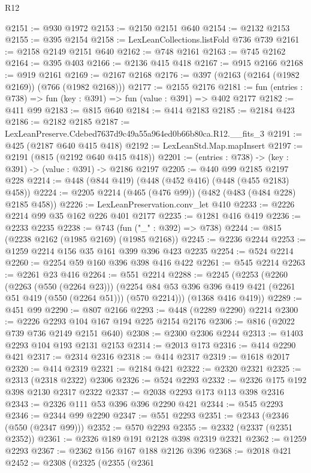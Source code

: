 \begin{lexlean}{R12}
\begin{coremodule}
@2151 := @930 @1972
@2153 := @2150 @2151 @640
@2154 := @2132 @2153
@2155 := @395 @2154
@2158 := LexLeanCollections.listFold @736 @739
@2161 := @2158 @2149 @2151 @640
@2162 := @748 @2161
@2163 := @745 @2162
@2164 := @395 @403
@2166 := @2136 @415 @418
@2167 := @915 @2166
@2168 := @919 @2161
@2169 := @2167 @2168
@2176 := @397 (@2163 (@2164 (@1982 @2169)) (@766 (@1982 @2168)))
@2177 := @2155 @2176
@2181 := fun (entries : @738) => fun (key : @391) => fun (value : @391) => @402 @2177
@2182 := @411 @99
@2183 := @815 @640
@2184 := @414 @2183
@2185 := @2184 @423
@2186 := @2182 @2185
@2187 := LexLeanPreserve.Cdebed7637d9c49a55a964ed0b66b80ca.R12.__fits_3
@2191 := @425 (@2187 @640 @415 @418)
@2192 := LexLeanStd.Map.mapInsert
@2197 := @2191 (@815 (@2192 @640 @415 @418))
@2201 := (entries : @738) -> (key : @391) -> (value : @391) -> @2186 @2197
@2205 := @440 @99 @2185 @2197 @228
@2214 := @448 (@844 @419) (@448 (@452 @416) (@448 (@455 @2183) @458))
@2224 := @2205 @2214 (@465 (@476 @99)) (@482 (@483 (@484 @228) @2185 @458))
@2226 := LexLeanPreservation.conv_let @410
@2233 := @2226 @2214 @99 @35 @162 @226 @401 @2177
@2235 := @1281 @416 @419
@2236 := @2233 @2235
@2238 := @743 (fun ("_" : @392) => @738)
@2244 := @815 (@2238 @2162 (@1985 @2169) (@1985 @2168))
@2245 := @2236 @2244
@2253 := @1259 @2214 @156 @35 @161 @399 @396 @423 @2235
@2254 := @524 @2214
@2260 := @2254 @59 @160 @396 @398 @416 @422
@2261 := @545 @2214
@2263 := @2261 @23 @416
@2264 := @551 @2214
@2288 := @2245
    (@2253
      (@2260
        (@2263 (@550 (@2264 @23)))
        (@2254 @84 @53 @396 @396 @419 @421 (@2261 @51 @419 (@550 (@2264 @51))) (@570 @2214)))
      (@1368 @416 @419))
@2289 := @451 @99
@2290 := @807 @2166
@2293 := @448 (@2289 @2290) @2214
@2300 := @2226 @2293 @104 @167 @194 @225 @2154 @2176
@2306 := @816 (@2022 @739 @736 @2149 @2151 @640)
@2308 := @2300 @2306 @2244
@2313 := @1403 @2293 @104 @193 @2131 @2153
@2314 := @2013 @173
@2316 := @414 @2290 @421
@2317 := @2314 @2316
@2318 := @414 @2317
@2319 := @1618 @2017
@2320 := @414 @2319
@2321 := @2184 @421
@2322 := @2320 @2321
@2325 := @2313 (@2318 @2322) @2306
@2326 := @524 @2293
@2332 := @2326 @175 @192 @398 @2130 @2317 @2322
@2337 := @2038 @2293 @173 @113 @398 @2316
@2343 := @2326 @111 @53 @396 @396 @2290 @421
@2344 := @545 @2293
@2346 := @2344 @99 @2290
@2347 := @551 @2293
@2351 := @2343 (@2346 (@550 (@2347 @99)))
@2352 := @570 @2293
@2355 := @2332 (@2337 (@2351 @2352))
@2361 := @2326 @189 @191 @2128 @398 @2319 @2321
@2362 := @1259 @2293
@2367 := @2362 @156 @167 @188 @2126 @396
@2368 := @2018 @421
@2452 := @2308
    (@2325
      (@2355
        (@2361

\end{coremodule}
\end{lexlean}
